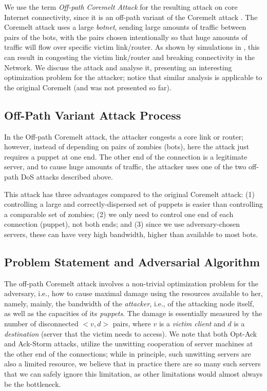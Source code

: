 \documentclass[conference]{IEEEtran}
\newcommand{\ignore}[1]{}
\begin{document}
We use the term {\em Off-path Coremelt Attack} for the resulting attack on core Internet connectivity, since it is an off-path variant of the Coremelt attack \cite{conf/esorics/StuderP09}. The Coremelt attack uses a large {\em botnet}, sending large amounts of traffic between pairs of the bots, with the pairs chosen intentionally so that huge amounts of traffic will flow over specific victim link/router. As shown by simulations in \cite{conf/esorics/StuderP09}, this can result in congesting the victim link/router and breaking connectivity in the Network. We discuss the attack and analyse it, presenting an interesting optimization problem for the attacker; notice that similar analysis is applicable to the original Coremelt (and was not presented so far).

\ignore{
Our evaluation of the off-path Coremelt attack will includes use simulations, extending on these of \cite{conf/esorics/StuderP09} (and comparing to their results); while we already have interesting results, we feel that this part of our study still is not ready for publication, and furthermore, there is not enough space in this submission to justify including these.}

\subsection{Off-Path Variant Attack Process}
In the Off-path Coremelt attack, the attacker congests a core link or router; however, instead of depending on pairs of zombies (bots), here the attack just requires a puppet at one end. The other end of the connection is a legitimate server, and to cause huge amounts of traffic, the attacker uses one of the two off-path DoS attacks described above. 

This attack has three advantages compared to the original Coremelt attack: (1) controlling a large and correctly-dispersed set of puppets is easier than controlling a comparable set of zombies; (2) we only need to control one end of each connection (puppet), not both ends; and (3) since we use adversary-chosen servers, these can have very high bandwidth, higher than available to most bots.  

\subsection{Problem Statement and Adversarial Algorithm}
The off-path Coremelt attack involves a non-trivial optimization problem for the adversary, i.e., how to cause maximal damage using the resources available to her, namely, mainly, the bandwidth of the {\em attacker}, i.e., of the attacking node itself, as well as the capacities of its {\em puppets}. The damage is essentially measured by the number of disconnected $<v,d>$ pairs, where $v$ is a {\em victim client} and $d$ is a {\em destination} (server that the victim needs to access). We note that both Opt-Ack and Ack-Storm attacks, utilize the unwitting cooperation of server machines at the other end of the connections; while in principle, such unwitting servers are also a limited resource, we believe that in practice there are so many such servers that we can safely ignore this limitation, as other limitations would almost always be the bottleneck. 
 
\end{document}
